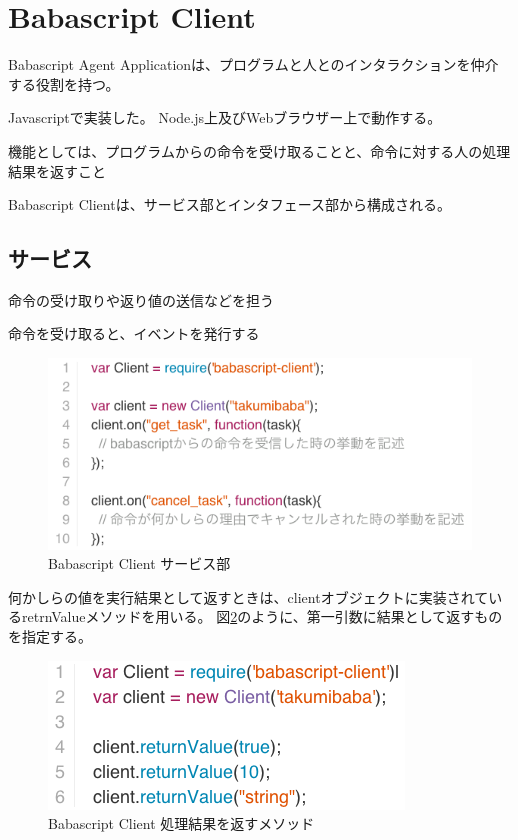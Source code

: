 \section{Babascript Client}\label{babascript-client}

Babascript Agent
Applicationは、プログラムと人とのインタラクションを仲介する役割を持つ。

Javascriptで実装した。 Node.js上及びWebブラウザー上で動作する。

機能としては、プログラムからの命令を受け取ることと、命令に対する人の処理結果を返すこと

Babascript Clientは、サービス部とインタフェース部から構成される。

\subsection{サービス}\label{ux30b5ux30fcux30d3ux30b9}

命令の受け取りや返り値の送信などを担う

命令を受け取ると、イベントを発行する

\begin{figure}[htbp]
  \begin{center}
  \includegraphics[width=.8\linewidth,bb=0 0 560 253]{images/babascript_client_service.js.png}
  \end{center}
  \caption{Babascript Client サービス部}
  \label{fig:babascript_client_service}
\end{figure}

何かしらの値を実行結果として返すときは、clientオブジェクトに実装されているretrnValueメソッドを用いる。
図\ref{fig:babascript_client_service_returnvalue}のように、第一引数に結果として返すものを指定する。

\begin{figure}[htbp]
  \begin{center}
  \includegraphics[width=.8\linewidth,bb=0 0 357 149]{images/babascript_client_service_returnvalue.js.png}
  \end{center}
  \caption{Babascript Client 処理結果を返すメソッド}
  \label{fig:babascript_client_service_returnvalue}
\end{figure}

